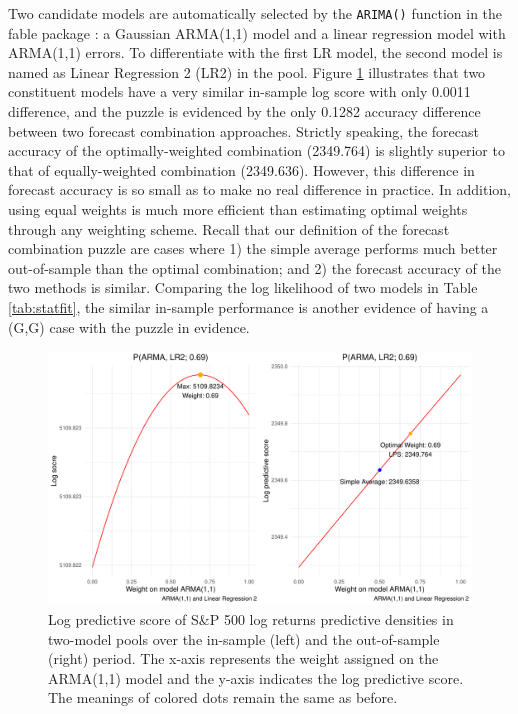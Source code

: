 \documentclass{monashthesis}
\begin{document}
Two candidate models are automatically selected by the \texttt{ARIMA()} function in the fable package \autocite{fpp23}: a Gaussian ARMA(1,1) model and a linear regression model with ARMA(1,1) errors. To differentiate with the first LR model, the second model is named as Linear Regression 2 (LR2) in the pool. Figure \ref{fig:stat} illustrates that two constituent models have a very similar in-sample log score with only 0.0011 difference, and the puzzle is evidenced by the only 0.1282 accuracy difference between two forecast combination approaches. Strictly speaking, the forecast accuracy of the optimally-weighted combination (2349.764) is slightly superior to that of equally-weighted combination (2349.636). However, this difference in forecast accuracy is so small as to make no real difference in practice. In addition, using equal weights is much more efficient than estimating optimal weights through any weighting scheme. Recall that our definition of the forecast combination puzzle are cases where 1) the simple average performs much better out-of-sample than the optimal combination; and 2) the forecast accuracy of the two methods is similar. Comparing the log likelihood of two models in Table \ref{tab:statfit}, the similar in-sample performance is another evidence of having a (G,G) case with the puzzle in evidence.

\begin{figure}[ht]
\centering
\includegraphics[scale=0.6]{figures/SP500_stationary.pdf}
\caption{Log predictive score of S\&P 500 log returns predictive densities in two-model pools over the in-sample (left) and the out-of-sample (right) period. The x-axis represents the weight assigned on the ARMA(1,1) model and the y-axis indicates the log predictive score. The meanings of colored dots remain the same as before.}
\label{fig:stat}
\end{figure}
\end{document}
